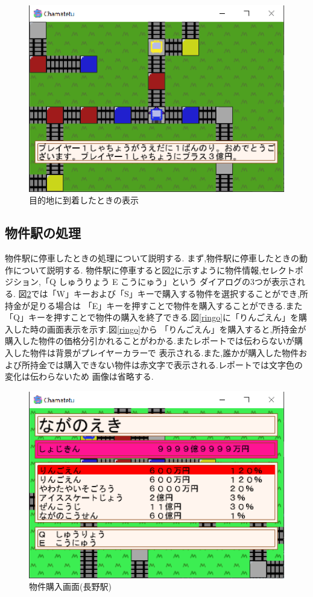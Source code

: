 \documentclass[a4j]{jarticle}
\begin{document}
    \begin{figure}[H]
        \centering
        \includegraphics[scale=1.3]{goal.eps}
        \caption{目的地に到着したときの表示}
         \label{goal}
        \end{figure} 

    \subsection{物件駅の処理}
    物件駅に停車したときの処理について説明する. まず,物件駅に停車したときの動作について説明する.
    物件駅に停車すると図\ref{purbutu}に示すように物件情報,セレクトポジション,「Q しゅうりょう E こうにゅう」という
    ダイアログの3つが表示される. 図\ref{purbutu}では「W」キーおよび「S」キーで購入する物件を選択することができ,所持金が足りる場合は
    「E」キーを押すことで物件を購入することができる.また「Q」キーを押すことで物件の購入を終了できる.図\ref{ringo}に「りんごえん」を購入した時の画面表示を示す.図\ref{ringo}から
    「りんごえん」を購入すると,所持金が購入した物件の価格分引かれることがわかる.またレポートでは伝わらないが購入した物件は背景がプレイヤーカラーで
    表示される.また,誰かが購入した物件および所持金では購入できない物件は赤文字で表示される.レポートでは文字色の変化は伝わらないため
    画像は省略する.

    \begin{figure}[H]
        \centering
        \includegraphics[scale=1.3]{purbutu.eps}
        \caption{物件購入画面(長野駅)}
         \label{purbutu}
        \end{figure} 
\end{document}

